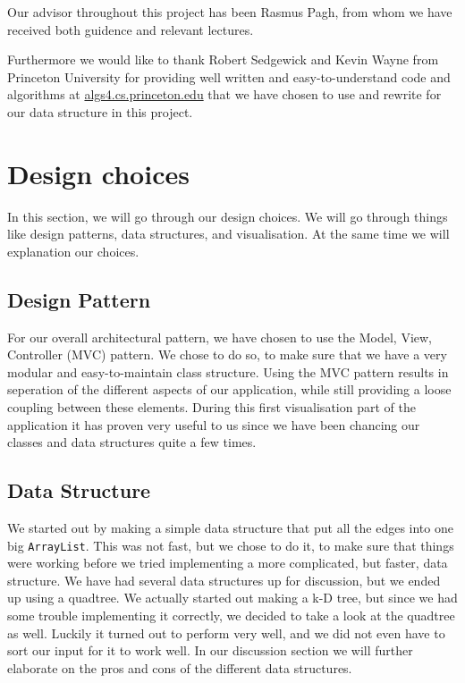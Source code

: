\documentclass[a4paper,11pt]{article}
\begin{document}
Our advisor throughout this project has been Rasmus Pagh, from whom we have received both guidence and relevant lectures. 

Furthermore we would like to thank Robert Sedgewick and Kevin Wayne from Princeton University for providing well written and easy-to-understand code and algorithms at \url{algs4.cs.princeton.edu} that we have chosen to use and rewrite for our data structure in this project.

\pagebreak
\section{Design choices} %
\label{sec:Design choices}
In this section, we will go through our design choices. We will go through things like design patterns, data structures, and visualisation.
At the same time we will explanation our choices.

\subsection{Design Pattern} %
\label{sub:Design Pattern}
For our overall architectural pattern, we have chosen to use the Model, View, Controller (MVC) pattern. We chose to do so, to make sure that we have
a very modular and easy-to-maintain class structure. Using the MVC pattern results in seperation of the different aspects of our application, while still providing a loose coupling between these elements. During this first visualisation part of the application it has proven very useful to us since we
have been chancing our classes and data structures quite a few times.


\subsection{Data Structure} %
\label{sub:Data Structure}
We started out by making a simple data structure that put all the edges into one big \texttt{ArrayList}. This was not fast, but we chose to do it, to make sure that
things were working before we tried implementing a more complicated, but faster, data structure. We have had several data structures up for discussion, but we ended up using a quadtree. We actually started out making a k-D tree, but since we had some trouble implementing it correctly, we decided to take a look at
the quadtree as well. Luckily it turned out to perform very well, and we did not even have to sort our input for it to work well. In our discussion 
section we will further elaborate on the pros and cons of the different data structures.
\end{document}
